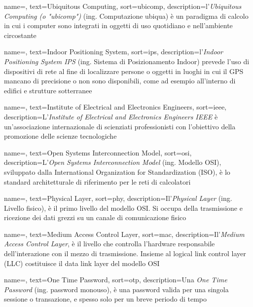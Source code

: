  {
    name=,
    text=Ubiquitous Computing,
    sort=ubicomp,
    description={l'\emph{Ubiquitous Computing (o "ubicomp")} (ing. Computazione ubiqua) è un paradigma di calcolo in cui i computer sono integrati in oggetti di uso quotidiano e nell'ambiente circostante}
}

 {
    name=,
    text=Indoor Positioning System,
    sort=ips,
    description={l'\emph{Indoor Positioning System IPS} (ing. Sistema di Posizionamento Indoor) prevede l'uso di dispositivi di rete al fine di localizzare persone o oggetti in luoghi in cui il GPS mancano di precisione o non sono disponibili, come ad esempio all'interno di edifici e strutture sotterranee}
}

 {
    name=,
    text=Institute of Electrical and Electronics Engineers,
    sort=ieee,
    description={L'\emph{Institute of Electrical and Electronics Engineers IEEE} è un'associazione internazionale di scienziati professionisti con l'obiettivo della promozione delle scienze tecnologiche}
}

 {
    name=,
    text=Open Systems Interconnection Model,
    sort=osi,
    description={L'\emph{Open Systems Interconnection Model} (ing. Modello OSI), sviluppato dalla International Organization for Standardization (ISO), è lo standard architetturale di riferimento per le reti di calcolatori}
}

 {
    name=,
    text=Physical Layer,
    sort=phy,
    description={Il'\emph{Physical Layer} (ing. Livello fisico), è il primo livello del modello OSI. Si occupa della trasmissione e ricezione dei dati grezzi su un canale di comunicazione fisico}
}

 {
    name=,
    text=Medium Access Control Layer,
    sort=mac,
    description={Il'\emph{Medium Access Control Layer}, è il livello che controlla l'hardware responsabile dell'interazione con il mezzo di trasmissione. Insieme al logical link control layer (LLC) costituisce il data link layer del modello OSI}
}

 {
    name=,
    text=One Time Password,
    sort=otp,
    description={Una \emph{One Time Password} (ing. password monouso), è una password valida per una singola sessione o transazione, e spesso solo per un breve periodo di tempo} 
}


